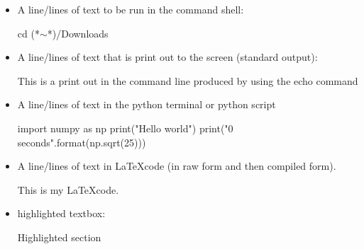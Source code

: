 \begin{itemize}
\item \begin{minipage}[t]{\textwidth} 
A line/lines of text to be run in the command shell:
\begin{latexbox}
\begin{cmdbox}
cd (*$\sim$*)/Downloads
\end{cmdbox}
\end{latexbox}
\end{minipage}


\item \begin{minipage}[t]{\textwidth} 
A line/lines of text that is print out to the screen (standard output):
\begin{latexbox}
\begin{cmdboxprint}
 This is a print out in the command line
 produced by using the echo command
\end{cmdboxprint}
\end{latexbox}
\end{minipage}


\item \begin{minipage}[t]{\textwidth} 
A line/lines of text in the python terminal or python script
\begin{latexbox}
\begin{pythonbox}
import numpy as np
print("Hello world")
print("{0} seconds".format(np.sqrt(25)))
\end{pythonbox}
\end{latexbox}
\end{minipage}


\item \begin{minipage}[t]{\textwidth} 
A line/lines of text in \LaTeX code (in raw form and then compiled form).
\begin{latexbox1}
\begin{latexbox}[colframe=blue!75!black,]
This is my \LaTeX code.
\end{latexbox}
\end{latexbox1}
\end{minipage}

\item \begin{minipage}[t]{\textwidth} 
highlighted textbox:
\begin{latexbox}
\begin{thighlight}
Highlighted section
\end{thighlight}
\end{latexbox}
\end{minipage}



\end{itemize}
